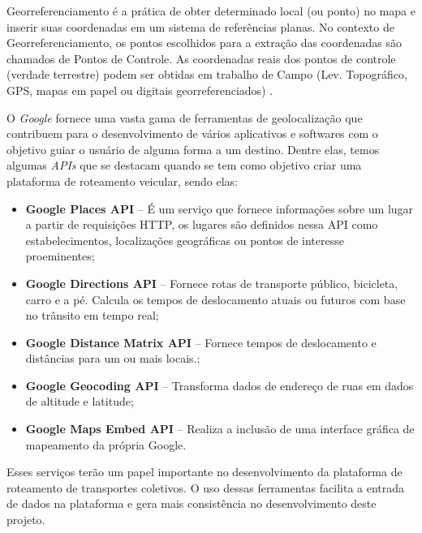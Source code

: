 Georreferenciamento é a prática de obter determinado local (ou ponto) no mapa e inserir suas coordenadas em um sistema de referências planas. No contexto de Georreferenciamento, os pontos escolhidos para a extração das coordenadas são chamados de Pontos de Controle. As coordenadas reais dos pontos de controle (verdade terrestre) podem ser obtidas em trabalho de Campo (Lev. Topográfico, GPS, mapas em papel ou digitais georreferenciados) \cite{georreferenciamento}.

O \emph{Google} fornece uma vasta gama de ferramentas de geolocalização que contribuem para o desenvolvimento de vários aplicativos e softwares com o objetivo guiar o usuário de alguma forma a um destino. Dentre elas, temos algumas \emph{APIs} que se destacam quando se tem como objetivo criar uma plataforma de roteamento veicular, sendo elas:
\begin{itemize}
    \item \textbf{Google Places API} -- É um serviço que fornece informações sobre um lugar a partir de requisições HTTP,  os lugares são definidos nessa API como estabelecimentos, localizações geográficas ou pontos de interesse proeminentes;
    \item \textbf{Google Directions API} -- Fornece rotas de transporte público, bicicleta, carro e a pé. Calcula os tempos de deslocamento atuais ou futuros com base no trânsito em tempo real;
    \item \textbf{Google Distance Matrix API} -- Fornece tempos de deslocamento e distâncias para um ou mais locais.;
    \item \textbf{Google Geocoding API} -- Transforma dados de endereço de ruas em dados de altitude e latitude;
    \item \textbf{Google Maps Embed API} -- Realiza a inclusão de uma interface gráfica de mapeamento da própria Google.
\end{itemize}

Esses serviços terão um papel importante no desenvolvimento da plataforma de roteamento de transportes coletivos. O uso dessas ferramentas facilita a entrada de dados na plataforma e gera mais consistência no desenvolvimento deste projeto.


